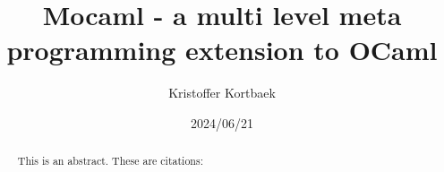 \documentclass[a4paper, 12pt]{article}
\title{Mocaml - a multi level meta programming extension to OCaml}
\author{Kristoffer Kortbaek}
\date{2024/06/21}
\begin{document}
\maketitle

\begin{abstract}
  This is an abstract.
  These are citations: \cite{metaML}\cite{metaOCaml}\cite{two-stage}\cite{multilevel}
\end{abstract}

\tableofcontents






\end{document}
